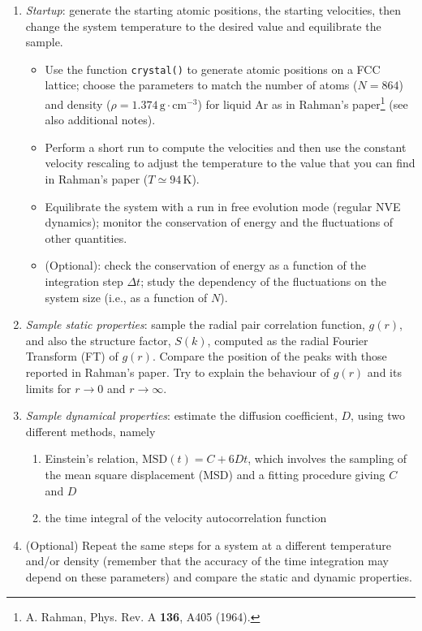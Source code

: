 \documentclass[12pt]{article}
\begin{document}
\begin{enumerate}
  \item \emph{Startup}: generate the starting atomic positions, the starting
	  velocities, then change the system temperature to the desired value
	  and equilibrate the sample.
  \begin{itemize}
		\item Use the function \verb!crystal()! to generate
	  atomic positions on a FCC lattice; choose the parameters to match
	  the number of atoms ($N=864$) and density
	  ($\rho=1.374\,\mathrm{g\cdot cm^{-3}}$) for liquid Ar as in Rahman's
	  paper\footnote{A. Rahman, Phys. Rev. A \textbf{136}, A405 (1964).}
	  (see also additional notes).
    \item Perform a short run to compute the velocities 
						and then use the constant velocity rescaling to adjust
	  the temperature to the value that you can find in Rahman's paper
	  ($T\simeq94\,\textrm{K}$).
    \item Equilibrate the system with a run in free evolution mode (regular NVE
	  dynamics); monitor the conservation of energy and the fluctuations
	  of other quantities.
    \item (Optional): check the conservation of energy as a function of the
	  integration step $\Delta t$; study the dependency of the
	  fluctuations on the system size (i.e., as a function of $N$).
  \end{itemize}

\item \emph{Sample static properties}: sample the radial pair correlation
	function, $g(r)$, and also the structure factor, $S(k)$, computed as the
	radial Fourier Transform (FT) of $g(r)$. Compare the position of the
	peaks with those reported in Rahman's paper. Try to explain the
	behaviour of $g(r)$ and its limits for $r\to0$ and $r\to\infty$.

\item \emph{Sample dynamical properties}: estimate the diffusion coefficient,
	$D$, using two different methods, namely
  \begin{enumerate}
    \item Einstein's relation, $\textrm{MSD}(t) = C + 6 D t$, which involves the
	    sampling of the mean square displacement (MSD) and a fitting
	    procedure giving $C$ and $D$
    \item the time integral of the velocity autocorrelation function 
   \end{enumerate}

\item (Optional) Repeat the same steps for a system at a different temperature
	and/or density (remember that the accuracy of the time integration may
	depend on these parameters) and compare the static and dynamic
	properties. 
\end{enumerate}
\end{document}
